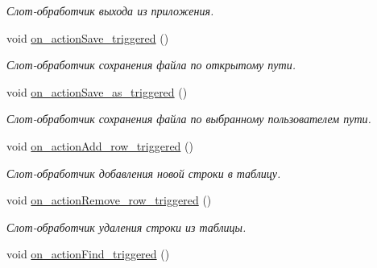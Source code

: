 \begin{DoxyCompactItemize}
\begin{DoxyCompactList}\small\item\em Слот-\/обработчик выхода из приложения. \end{DoxyCompactList}\item 
\mbox{\label{class_main_window_ad550c61cfa05c7e528dedc6cf636ed10}} 
void \mbox{\hyperlink{class_main_window_ad550c61cfa05c7e528dedc6cf636ed10}{on\+\_\+action\+Save\+\_\+triggered}} ()
\begin{DoxyCompactList}\small\item\em Слот-\/обработчик сохранения файла по открытому пути. \end{DoxyCompactList}\item 
\mbox{\label{class_main_window_ac9d9bb227fec320d80f2bd430336b54d}} 
void \mbox{\hyperlink{class_main_window_ac9d9bb227fec320d80f2bd430336b54d}{on\+\_\+action\+Save\+\_\+as\+\_\+triggered}} ()
\begin{DoxyCompactList}\small\item\em Слот-\/обработчик сохранения файла по выбранному пользователем пути. \end{DoxyCompactList}\item 
\mbox{\label{class_main_window_aa5122cd3fe0f06d3b3ecf4d22f6653df}} 
void \mbox{\hyperlink{class_main_window_aa5122cd3fe0f06d3b3ecf4d22f6653df}{on\+\_\+action\+Add\+\_\+row\+\_\+triggered}} ()
\begin{DoxyCompactList}\small\item\em Слот-\/обработчик добавления новой строки в таблицу. \end{DoxyCompactList}\item 
\mbox{\label{class_main_window_aacb7a8dd83066e074715bf4e3057bdac}} 
void \mbox{\hyperlink{class_main_window_aacb7a8dd83066e074715bf4e3057bdac}{on\+\_\+action\+Remove\+\_\+row\+\_\+triggered}} ()
\begin{DoxyCompactList}\small\item\em Слот-\/обработчик удаления строки из таблицы. \end{DoxyCompactList}\item 
\mbox{\label{class_main_window_af876cd5a47fe892e0935ed3a5a9720c6}} 
void \mbox{\hyperlink{class_main_window_af876cd5a47fe892e0935ed3a5a9720c6}{on\+\_\+action\+Find\+\_\+triggered}} ()

\end{DoxyCompactItemize}
